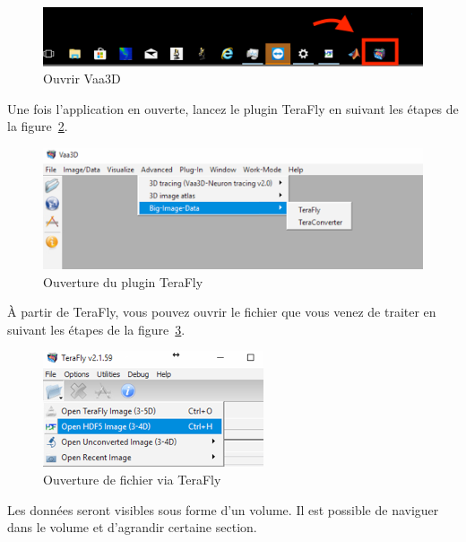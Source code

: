 \begin{figure}[H]
    \centering
    \includegraphics[scale = 0.7]{taskbar2.png}
    \caption{Ouvrir Vaa3D}
    \label{fig:vaad}
\end{figure}

Une fois l'application en ouverte, lancez le plugin TeraFly en suivant les étapes de la figure~\ref{fig:big}.

\begin{figure}[H]
    \centering
    \includegraphics[scale = 0.7]{big.png}
    \caption{ Ouverture du plugin TeraFly}
    \label{fig:big}
\end{figure}

À partir de TeraFly, vous pouvez ouvrir le fichier que vous venez de traiter en suivant les étapes de la figure~\ref{fig:tera}.

\begin{figure}[H]
    \centering
    \includegraphics[scale = 1]{tera.png}
    \caption{Ouverture de fichier via TeraFly}
    \label{fig:tera}
\end{figure}

Les données seront visibles sous forme d'un volume. Il est possible de naviguer dans le volume et d'agrandir certaine section.